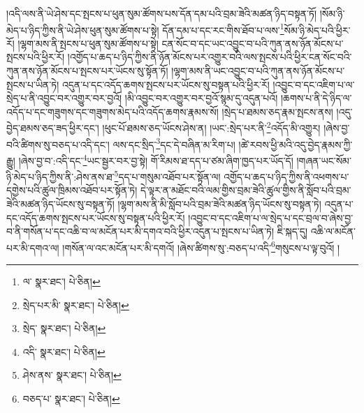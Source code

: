 །འདི་ལས་ནི་ཡེ་ཤེས་དང་སྤངས་པ་ཕུན་སུམ་ཚོགས་པས་དོན་དམ་པའི་བྲམ་ཟེའི་མཚན་ཉིད་བསྟན་ཏོ། །སོམ་ཉི་མེད་པ་ཉིད་ཀྱིས་ནི་ཡེ་ཤེས་ཕུན་སུམ་ཚོགས་པ་སྟེ། དོན་དམ་པ་དང་རང་གིས་ཐོབ་པ་ལས་\footnote{ལ་  སྣར་ཐང་།  པེ་ཅིན། }སོམ་ཉི་མེད་པའི་ཕྱིར་རོ། །ལྷག་མས་ནི་སྤངས་པ་ཕུན་སུམ་ཚོགས་པ་སྟེ། ངན་སོང་བ་དང་ཡང་འབྱུང་བ་པའི་ཀུན་ནས་ཉོན་མོངས་པ་སྤངས་པའི་ཕྱིར་རོ། །འགྱོད་པ་ཆད་པ་ཉིད་ཀྱིས་ནི་ཉོན་མོངས་པར་འགྱུར་བའི་ལས་སྤངས་པའི་ཕྱིར་ངན་སོང་བའི་ཀུན་ནས་ཉོན་མོངས་པ་སྤངས་པར་ཡོངས་སུ་སྟོན་ཏོ། །ལྷག་མས་ནི་ཡང་འབྱུང་བ་པའི་ཀུན་ནས་ཉོན་མོངས་པ་སྤངས་པ་ཡིན་ཏེ། འདུན་པ་དང་འདོད་ཆགས་སྤངས་པར་ཡོངས་སུ་བསྟན་པའི་ཕྱིར་རོ། །འབྱུང་བ་དང་འཇིག་པ་ལ་སྲེད་པ་ནི་འབྱུང་བར་འགྱུར་བར་བྱའོ། །མི་འབྱུང་བར་འགྱུར་བར་བྱའོ་སྙམ་དུ་འདུན་པའོ། །ཆགས་པ་ནི་དེ་ཉིད་ལ་འདོད་པ་དང་གཟུགས་དང་གཟུགས་མེད་པའི་འདོད་ཆགས་རྣམས་སོ། །སྲེད་པ་ཐམས་ཅད་རྣམ་སྤངས་ནས། །འདུ་བྱེད་ཐམས་ཅད་ཟད་ཕྱིར་དང་། །ཕུང་པོ་ཐམས་ཅད་ཡོངས་ཤེས་ན། །ཡང་:སྲེད་པར་ནི་\footnote{སྲེད་པར་མི་  སྣར་ཐང་།  པེ་ཅིན། }འདོད་མི་འགྱུར། །ཞེས་བྱ་བའི་ཚིགས་སུ་བཅད་པ་འདི་དང་། ལས་དང་སྲིད་\footnote{སྲེད་  སྣར་ཐང་།  པེ་ཅིན། }དང་དེ་བཞིན་མ་རིག་པ། །ཚེ་རབས་ཕྱི་མའི་འདུ་བྱེད་རྣམས་ཀྱི་རྒྱུ། །ཞེས་བྱ་བ་:འདི་དང་\footnote{འདི་  སྣར་ཐང་།  པེ་ཅིན། }ཡང་སྦྱར་བར་བྱ་སྟེ། གོ་རིམས་ཐ་དད་པ་ཙམ་ཞིག་ཁྱད་པར་ཡོད་དོ། །གཞན་ཡང་སོམ་ཉི་མེད་པ་ཉིད་ཀྱིས་ནི་:ཤེས་ནས་ཐ་\footnote{ཤེས་ནས་  སྣར་ཐང་།  པེ་ཅིན། }དད་པ་གསུམ་འཐོབ་པར་སྟོན་ལ། འགྱོད་པ་ཆད་པ་ཉིད་ཀྱིས་ནི་འཕགས་པ་དགྱེས་པའི་ཚུལ་ཁྲིམས་འཐོབ་པར་སྟོན་ཏེ། དེ་ལྟར་ན་མཐོང་བའི་ལམ་གྱིས་བྲམ་ཟེའི་ཚུལ་གྱིས་ནི་སློབ་པའི་བྲམ་ཟེའི་མཚན་ཉིད་ཡོངས་སུ་བསྟན་ཏོ། །ལྷག་མས་ནི་མི་སློབ་པའི་བྲམ་ཟེའི་མཚན་ཉིད་ཡོངས་སུ་བསྟན་ཏེ། འདུན་པ་དང་འདོད་ཆགས་སྤངས་པར་ཡོངས་སུ་བསྟན་པའི་ཕྱིར་རོ། །འབྱུང་བ་དང་འཇིག་པ་ལ་སྲེད་པ་དང་བྲལ་བ་ཞེས་བྱ་བ་ནི་གསོན་པ་དང་འཆི་བ་ལ་མངོན་པར་མི་དགའ་བའི་ཕྱིར་འདུན་པ་སྤངས་པ་ཡིན་ཏེ། ཇི་སྐད་དུ། འཆི་ལ་མངོན་པར་མི་དགའ་ལ། །གསོན་ལ་འང་མངོན་པར་མི་དགའོ། །ཞེས་ཚིགས་སུ་:བཅད་པ་འདི་\footnote{བཅད་པ་  སྣར་ཐང་།  པེ་ཅིན། }གསུངས་པ་ལྟ་བུའོ། །
